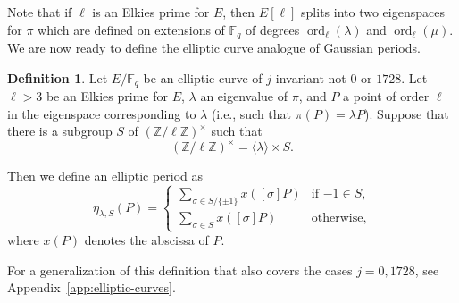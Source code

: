 \documentclass[12pt]{article}
\theoremstyle{plain}
\theoremstyle{definition}
\newtheorem{definition}[theorem]{Definition}
\DeclareMathOperator{\order}{ord} %
\def\Z{\ensuremath{\mathbb{Z}}}
\def\F{\ensuremath{\mathbb{F}}}
\begin{document}
Note that if $\ell$ is an Elkies prime for $E$, then $E[\ell]$ splits
into two eigenspaces for $\pi$ which are defined on extensions of
$\F_q$ of degrees $\order_\ell(\lambda)$ and $\order_\ell(\mu)$. We
are now ready to define the elliptic curve analogue of Gaussian
periods.

\begin{definition}
  \label{definition:ellperiod}
  Let $E/\F_q$ be an elliptic curve of $j$-invariant not $0$ or
  $1728$. %
  Let $\ell > 3$ be an Elkies prime for $E$, $\lambda$ an eigenvalue
  of $\pi$, and $P$ a point of order $\ell$ in the eigenspace
  corresponding to $\lambda$ (i.e., such that $\pi(P)=\lambda P$).
  Suppose that there is a subgroup $S$ of $(\Z/\ell\Z)^{\times}$ such
  that
  \begin{equation}
    (\Z/\ell\Z)^{\times} = \langle{\lambda}\rangle \times S.
  \end{equation}
  
  Then we define an elliptic period as
  \begin{equation}
    \eta_{\lambda,S}(P) =
    \begin{cases}
      \sum_{\sigma\in S/\{\pm1\}} {x \left([\sigma] P \right)} & \text{if $-1\in S$,}\\
      \sum_{\sigma\in S} {x \left([\sigma] P \right)} & \text{otherwise,}
    \end{cases}
  \end{equation}
  where $x(P)$ denotes the abscissa of $P$.
\end{definition}

For a generalization of this definition that also covers the cases
$j=0,1728$, see Appendix~\ref{app:elliptic-curves}.
\end{document}
